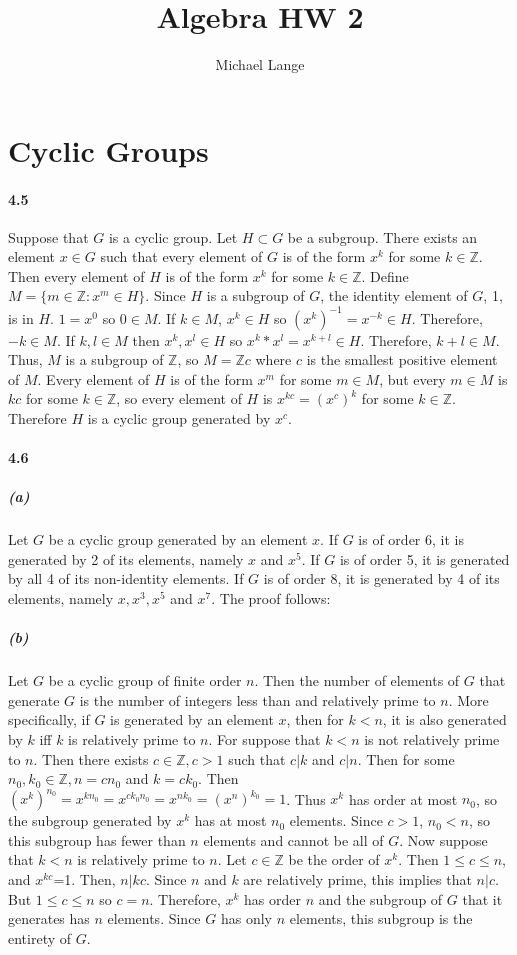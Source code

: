 \documentclass{article}
\title{Algebra HW 2}
\author{Michael Lange}
\begin{document}
\section{Cyclic Groups}
\paragraph{4.5}
Suppose that $G$ is a cyclic group. Let $H\subset G$ be a subgroup. There exists an element $x\in G$ such that every element of $G$ is of the form $x^k$ for some $k\in \mathbb{Z}$. Then every element of $H$ is of the form $x^k$ for some $k\in \mathbb{Z}$. Define $M=\{m\in \mathbb{Z} :x^m\in H\}$. Since $H$ is a subgroup of $G$, the identity element of $G$, 1, is in $H$. $1=x^0$ so $0\in M$. If $k\in M$, $x^k\in H$ so $(x^k)^{-1}=x^{-k}\in H$. Therefore, $-k\in M$. If $k,l\in M$ then $x^k, x^l\in H$ so $x^k*x^l=x^{k+l}\in H$. Therefore, $k+l\in M$. Thus, $M$ is a subgroup of $\mathbb{Z}$, so $M=\mathbb{Z}c$ where $c$ is the smallest positive element of $M$. Every element of $H$ is of the form $x^m$ for some $m\in M$, but every $m\in M$ is $kc$ for some $k\in \mathbb{Z}$, so every element of $H$ is $x^{kc}=(x^c)^k$ for some $k\in \mathbb{Z}$. Therefore $H$ is a cyclic group generated by $x^c$.

\paragraph{4.6}
\subparagraph{(a)}
Let $G$ be a cyclic group generated by an element $x$. If $G$ is of order 6, it is generated by 2 of its elements, namely $x$ and $x^5$. If $G$ is of order 5, it is generated by all 4 of its non-identity elements. If $G$ is of order 8, it is generated by 4 of its elements, namely $x, x^3, x^5$ and $x^7$. The proof follows:
\subparagraph{(b)}
Let $G$ be a cyclic group of finite order $n$. Then the number of elements of $G$ that generate $G$ is the number of integers less than and relatively prime to $n$. More specifically, if $G$ is generated by an element $x$, then for $k<n$, it is also generated by $k$ iff $k$ is relatively prime to $n$. For suppose that $k<n$ is not relatively prime to $n$. Then there exists $c\in \mathbb{Z}, c>1$ such that $c|k$ and $c|n$. Then for some $n_0, k_0\in \mathbb{Z}, n=cn_0$ and $k=ck_0$. Then $(x^k)^{n_0}=x^{kn_0}=x^{ck_0n_0}=x^{nk_0}=(x^n)^{k_0}=1$. Thus $x^k$ has order at most $n_0$, so the subgroup generated by $x^k$ has at most $n_0$ elements. Since $c>1$, $n_0<n$, so this subgroup has fewer than $n$ elements and cannot be all of $G$.\newline
Now suppose that $k<n$ is relatively prime to $n$. Let $c\in \mathbb{Z}$ be the order of $x^k$. Then $1\le c\le n$, and $x^{kc}$=1. Then, $n|kc$. Since $n$ and $k$ are relatively prime, this implies that $n|c$. But $1\le c\le n$ so $c=n$. Therefore, $x^k$ has order $n$ and the subgroup of $G$ that it generates has $n$ elements. Since $G$ has only $n$ elements, this subgroup is the entirety of $G$.
\end{document}
